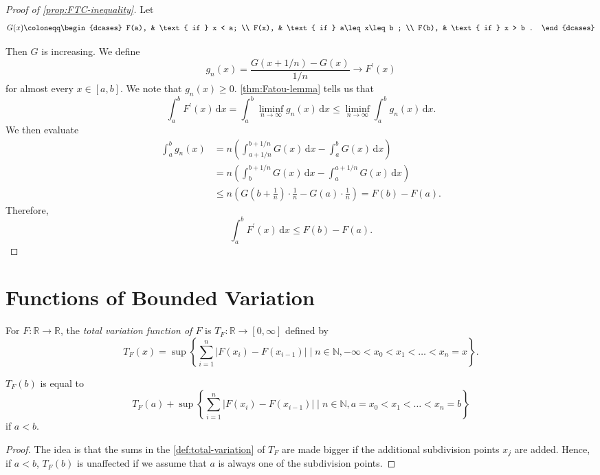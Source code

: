 \begin{proof}[Proof of \autoref{prop:FTC-inequality}]
	Let
	\[
		G(x)\coloneqq \begin{dcases}
			F(a), & \text{ if } x < a;          \\
			F(x), & \text{ if } a\leq x\leq b ; \\
			F(b), & \text{ if } x > b .
		\end{dcases}
	\]

	Then \(G\) is increasing. We define
	\[
		g_n(x) = \frac{G(x+1/n)- G(x)}{1/n} \to F^\prime (x)
	\]
	for almost every \(x \in [a,b]\). We note that \(g_n(x) \geq 0\). \autoref{thm:Fatou-lemma} tells us that
	\[
		\int_a^b F^\prime (x) \,\mathrm{d} x = \int_a^b \liminf_{n \to \infty} g_n(x) \,\mathrm{d} x \leq \liminf_{n \to \infty} \int_a^b g_n(x) \,\mathrm{d} x.
	\]
	We then evaluate
	\[
		\begin{split}
			\int_a^b g_n(x) &= n\left( \int_{a+1/n}^{b+1/n} G(x) \,\mathrm{d} x - \int_a^b G(x) \,\mathrm{d} x \right)  \\
			&= n\left( \int_b^{b+1/n} G(x) \,\mathrm{d} x - \int_a^{a+1/n} G(x) \,\mathrm{d} x \right) \\
			&\leq n\left( G\left( b + \frac{1}{n} \right) \cdot \frac{1}{n} - G(a) \cdot \frac{1}{n}  \right)
			= F(b) - F(a).
		\end{split}
	\]
	Therefore,
	\[
		\int_a^b F^\prime (x) \,\mathrm{d} x \leq F(b) - F(a).
	\]
\end{proof}

\section{Functions of Bounded Variation}
\begin{definition}\label{def:total-variation-function}
	For \(F \colon \mathbb{R} \to \mathbb{R}\), the \emph{total variation function of \(F\)} is \(T_F \colon \mathbb{R} \to [0,\infty]\) defined by
	\[
		T_F(x) = \sup \left\{\sum_{i=1}^n \left\vert F(x_i) - F(x_{i-1}) \right\vert \mid n \in \mathbb{N}, -\infty < x_0 < x_1 < \dots < x_n = x\right\}.
	\]
\end{definition}

\begin{lemma}\label{lma:lec34-1}
	\(T_F(b)\) is equal to
	\[
		T_F(a) + \sup \left\{\sum_{i=1}^n \left\vert F(x_i) - F(x_{i-1}) \right\vert \mid n \in \mathbb{N}, a = x_0 < x_1 < \dots < x_n = b\right\}
	\]
	if \(a < b\).
\end{lemma}
\begin{proof}
	The idea is that the sums in the \autoref{def:total-variation} of \(T_F\) are made bigger if the additional subdivision points \(x_{j} \) are added. Hence,
	if \(a <b\), \(T_F(b)\) is unaffected if we assume that \(a\) is always one of the subdivision points.
\end{proof}

